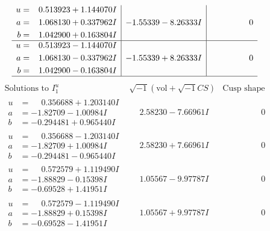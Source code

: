 \documentclass[1p]{elsarticle_modified}
\theoremstyle{definition}
\newcommand{\I}{\sqrt{-1}}
\begin{document}
$$\begin{array}{c|c|c}
\begin{aligned}
u &= \phantom{-}0.513923 + 1.144070 I \\
a &= \phantom{-}1.068130 + 0.337962 I \\
b &= \phantom{-}1.042900 + 0.163804 I\end{aligned}
 & -1.55339 - 8.26333 I & \phantom{-0.000000 } 0 \\ \hline\begin{aligned}
u &= \phantom{-}0.513923 - 1.144070 I \\
a &= \phantom{-}1.068130 - 0.337962 I \\
b &= \phantom{-}1.042900 - 0.163804 I\end{aligned}
 & -1.55339 + 8.26333 I & \phantom{-0.000000 } 0\\
 \hline 
 \end{array}$$\newpage$$\begin{array}{c|c|c}  
\text{Solutions to }I^u_{1}& \I (\text{vol} + \sqrt{-1}CS) & \text{Cusp shape}\\
 \hline 
\begin{aligned}
u &= \phantom{-}0.356688 + 1.203140 I \\
a &= -1.82709 - 1.00984 I \\
b &= -0.294481 + 0.965440 I\end{aligned}
 & \phantom{-}2.58230 - 7.66961 I & \phantom{-0.000000 } 0 \\ \hline\begin{aligned}
u &= \phantom{-}0.356688 - 1.203140 I \\
a &= -1.82709 + 1.00984 I \\
b &= -0.294481 - 0.965440 I\end{aligned}
 & \phantom{-}2.58230 + 7.66961 I & \phantom{-0.000000 } 0 \\ \hline\begin{aligned}
u &= \phantom{-}0.572579 + 1.119490 I \\
a &= -1.88829 - 0.15398 I \\
b &= -0.69528 + 1.41951 I\end{aligned}
 & \phantom{-}1.05567 - 9.97787 I & \phantom{-0.000000 } 0 \\ \hline\begin{aligned}
u &= \phantom{-}0.572579 - 1.119490 I \\
a &= -1.88829 + 0.15398 I \\
b &= -0.69528 - 1.41951 I\end{aligned}
 & \phantom{-}1.05567 + 9.97787 I & \phantom{-0.000000 } 0 \\ \hline\begin{aligned}

\end{aligned}
\end{array}$$
\end{document}
